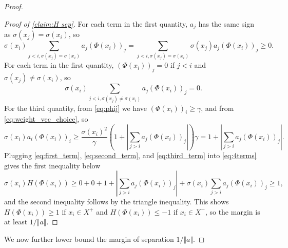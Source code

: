 \documentclass[aoap]{imsart}
\numberwithin{equation}{section}
\theoremstyle{definition}
\theoremstyle{remark}
\numberwithin{equation}{section}
\newcommand{\0}{\mathbf{0}}
\newcommand{\1}{\mathbf{1}}
\numberwithin{equation}{section}
\begin{document}
\begin{proof}
\begin{proof}[Proof of \cref{claim:H sep}]
For each term in the first quantity, $a_j$ has the same sign as $\sigma(x_j)=\sigma(x_i)$, so
\begin{equation}\label{eq:first_term}
    \sigma(x_i) \sum_{j<i, \sigma(x_j) =\sigma(x_i) }a_{j}(\Phi(x_{i}))_{j} = \sum_{j<i, \sigma(x_j) =\sigma(x_i) }\sigma(x_j)a_{j}(\Phi(x_{i}))_{j} \ge 0.
\end{equation}
For each term in the first quantity, $(\Phi(x_i))_j = 0$ if $j<i$ and $\sigma(x_j) \neq \sigma(x_i)$, so
\begin{equation}\label{eq:second_term}
    \sigma(x_i) \sum_{j<i, \sigma(x_j) \neq \sigma(x_i) }a_{j}(\Phi(x_{i}))_{j} = 0.
\end{equation}
For the third quantity, from \eqref{eq:phij} we have $(\Phi(x_{i}))_{i} \ge \gamma$, and from \eqref{eq:weight_vec_choice}, so
\begin{equation}\label{eq:third_term}
    \sigma(x_i) a_{i}(\Phi(x_{i}))_{i} \ge \frac{\sigma(x_i) ^{2}}{\gamma}\left(1+\left|\sum_{j>i}a_{j}(\Phi(x_{i}))_{j}\right|\right)\gamma = 1+\left|\sum_{j>i}a_{j}(\Phi(x_{i}))_{j}\right|.
\end{equation}
Plugging \eqref{eq:first_term}, \eqref{eq:second_term}, and \eqref{eq:third_term} into \eqref{eq:4terms} gives the first inequality below
\[
\sigma(x_i)  H(\Phi(x_{i}))  \geq 0 + 0 + 1+\left|\sum_{j>i}a_{j}(\Phi(x_{i}))_{j}\right| + \sigma(x_i) \sum_{j>i}a_{j}(\Phi(x_{i}))_{j}
 \geq 1,
\]
and the second inequality follows by the triangle inequality. This shows $H (\Phi(x_{i}))\geq 1$ if $x_{i}\in X^{+}$ and $H (\Phi(x_{i}))\leq -1$  if $x_{i}\in X^{-}$, so the margin is at least $1/\Vert a\Vert$.
\end{proof}

We now further lower bound the margin of separation $1/\Vert a\Vert$.


\end{proof}
\end{document}
